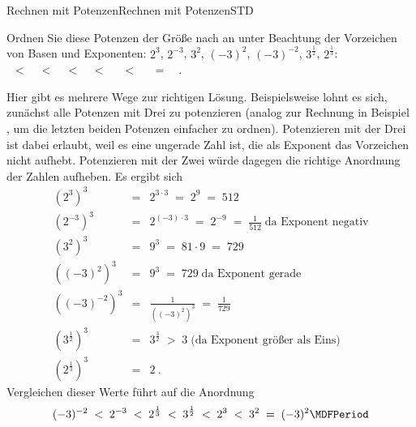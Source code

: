 \begin{MXContent}{Rechnen mit Potenzen}{Rechnen mit Potenzen}{STD}
\begin{MExercise}
Ordnen Sie diese Potenzen der Größe nach an unter Beachtung der Vorzeichen von Basen und Exponenten: $2^3$, $2^{-3}$, $3^2$, $(-3)^2$, $(-3)^{-2}$, $3^{\frac12}$, $2^{\frac13}$:
\ \\
\ $<$\ 
\ $<$\ 
\ $<$\ 
\ $<$\ 
 \ $<$\ 
 \ $=$\ 
\ .
\ \\
\begin{MHint}{\iSolution}
Hier gibt es mehrere Wege zur richtigen Lösung. Beispielsweise lohnt es sich, zunächst alle Potenzen mit Drei zu potenzieren (analog zur Rechnung in Beispiel , um die letzten beiden Potenzen einfacher zu ordnen).
Potenzieren mit der Drei ist dabei erlaubt, weil es eine ungerade Zahl ist, die als Exponent das Vorzeichen nicht aufhebt. Potenzieren mit der Zwei würde dagegen die richtige
Anordnung der Zahlen aufheben. Es ergibt sich
\begin{eqnarray*}
(2^3)^3 &=& 2^{3\cdot 3} \;=\; 2^9 \;=\; 512\\
(2^{-3})^3 &=& 2^{(-3)\cdot 3}\;=\; 2^{-9} \;=\; \frac1{512}\;\text{da Exponent negativ}\\
(3^2)^3 &=& 9^3 \;=\; 81\cdot9 \;=\; 729\\
((-3)^2)^3 &=& 9^3 \;=\; 729\;\text{da Exponent gerade}\\
((-3)^{-2})^3 &=& \frac1{((-3)^2)^3} \;=\; \frac1{729}\\
(3^{\frac12})^3 &=& 3^{\frac32}\; >\; 3 \;\text{(da Exponent größer als Eins)}\\
(2^{\frac13})^3 &=& 2\: .
\end{eqnarray*}
Vergleichen dieser Werte führt auf die Anordnung
$$
(-3)^{-2}\;<\;2^{-3}\;<\;2^{\frac13}\;<\;3^{\frac12}\; < \; 2^3\; < \; 3^2 \;=\; (-3)^2\MDFPeriod
$$
\end{MHint}
\end{MExercise}

\end{MXContent}

